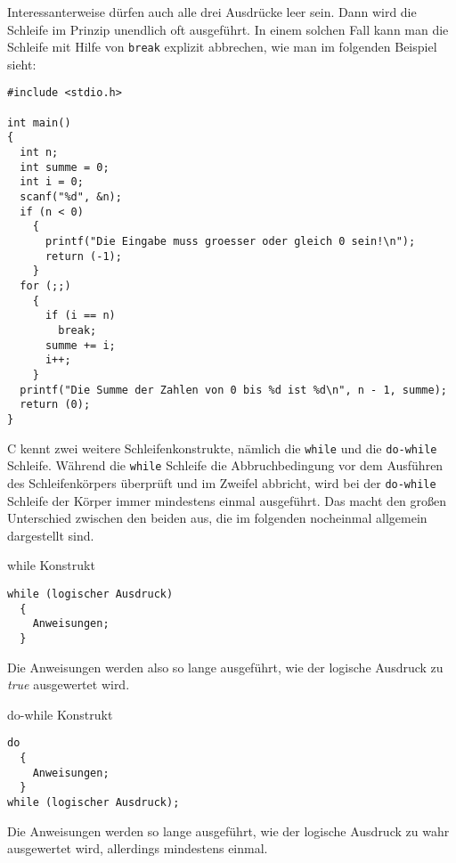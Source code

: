 Interessanterweise dürfen auch alle drei Ausdrücke leer sein.
Dann wird die Schleife im Prinzip unendlich oft ausgeführt.
In einem solchen Fall kann man die Schleife mit Hilfe von \verb|break| explizit abbrechen, wie man im folgenden Beispiel sieht:
\begin{lstlisting}
#include <stdio.h>

int main()
{
  int n;
  int summe = 0;
  int i = 0;
  scanf("%d", &n);
  if (n < 0)
    {
      printf("Die Eingabe muss groesser oder gleich 0 sein!\n");
      return (-1);
    }
  for (;;)
    {
      if (i == n)
        break;
      summe += i;
      i++;
    }
  printf("Die Summe der Zahlen von 0 bis %d ist %d\n", n - 1, summe);
  return (0);
}
\end{lstlisting}
C kennt zwei weitere Schleifenkonstrukte, nämlich die \verb|while| und die \verb|do-while| Schleife.
Während die \verb|while| Schleife die Abbruchbedingung vor dem Ausführen des Schleifenkörpers überprüft und im Zweifel abbricht, wird bei der \verb|do-while| Schleife der Körper immer mindestens einmal ausgeführt.
Das macht den großen Unterschied zwischen den beiden aus, die im folgenden nocheinmal allgemein dargestellt sind.
\begin{myalertblock}{while Konstrukt}
\begin{lstlisting}
while (logischer Ausdruck)
  {
    Anweisungen;
  }
\end{lstlisting}
\vspace{-0.5cm}
Die Anweisungen werden also so lange ausgeführt, wie der logische Ausdruck zu \emph{true} ausgewertet wird.
\end{myalertblock}

\begin{myalertblock}{do-while Konstrukt}
\begin{lstlisting}
do
  {
    Anweisungen;
  }
while (logischer Ausdruck);
\end{lstlisting}
\vspace{-0.5cm}
Die Anweisungen werden so lange ausgeführt, wie der logische Ausdruck zu wahr ausgewertet wird, allerdings mindestens einmal.
\end{myalertblock}

\endinput
